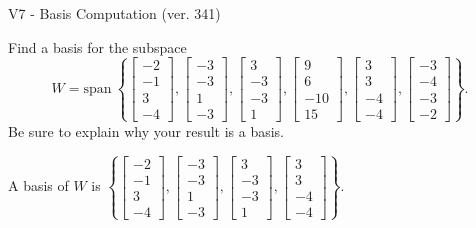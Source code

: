 \begin{exercise}
  \begin{exerciseTitle}V7 - Basis Computation (ver. 341)\end{exerciseTitle}
  \begin{exerciseStatement}
    Find a basis for the subspace 
\[W=\mathrm{span}\ \left\{\left[\begin{array}{r}
-2 \\
-1 \\
3 \\
-4
\end{array}\right] , \left[\begin{array}{r}
-3 \\
-3 \\
1 \\
-3
\end{array}\right] , \left[\begin{array}{r}
3 \\
-3 \\
-3 \\
1
\end{array}\right] , \left[\begin{array}{r}
9 \\
6 \\
-10 \\
15
\end{array}\right] , \left[\begin{array}{r}
3 \\
3 \\
-4 \\
-4
\end{array}\right] , \left[\begin{array}{r}
-3 \\
-4 \\
-3 \\
-2
\end{array}\right]\right\}.\]
 Be sure to explain why your result is a basis.


  \end{exerciseStatement}
  \begin{exerciseAnswer}
   A basis of \(W\) is  \(\left\{\left[\begin{array}{r}
-2 \\
-1 \\
3 \\
-4
\end{array}\right] , \left[\begin{array}{r}
-3 \\
-3 \\
1 \\
-3
\end{array}\right] , \left[\begin{array}{r}
3 \\
-3 \\
-3 \\
1
\end{array}\right] , \left[\begin{array}{r}
3 \\
3 \\
-4 \\
-4
\end{array}\right]\right\}\).
  


  \end{exerciseAnswer}
\end{exercise}